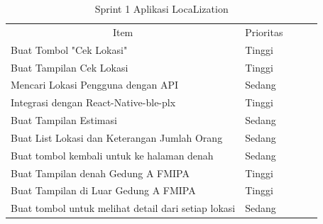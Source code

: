 \begin{enumerate}[1.]
	      \begin{table}[H]
		      \centering
		      \caption{Sprint 1 Aplikasi LocaLization}
		      \label{LocaLization-sprint-1}
		      \begin{tabular}{lllll}
			      \cline{1-2}
			      \multicolumn{1}{|c|}{\cellcolor[HTML]{FFFFFF}Item}                        & \multicolumn{1}{c|}{\cellcolor[HTML]{FFFFFF}Prioritas} &  &  & \\ \cline{1-2}
			      \multicolumn{1}{|l|}{Buat Tombol "Cek Lokasi"}                            & \multicolumn{1}{l|}{Tinggi}                            &  &  & \\ \cline{1-2}
			      \multicolumn{1}{|l|}{Buat Tampilan Cek Lokasi}                            & \multicolumn{1}{l|}{Tinggi}                            &  &  & \\ \cline{1-2}
			      \multicolumn{1}{|l|}{Mencari Lokasi Pengguna dengan API}                  & \multicolumn{1}{l|}{Sedang}                            &  &  & \\ \cline{1-2}
			      \multicolumn{1}{|l|}{Integrasi dengan React-Native-ble-plx}               & \multicolumn{1}{l|}{Tinggi}                            &  &  & \\ \cline{1-2}
			      \multicolumn{1}{|l|}{Buat Tampilan Estimasi}                              & \multicolumn{1}{l|}{Sedang}                            &  &  & \\ \cline{1-2}
			      \multicolumn{1}{|l|}{Buat List Lokasi dan Keterangan Jumlah Orang}        & \multicolumn{1}{l|}{Sedang}                            &  &  & \\ \cline{1-2}
			      \multicolumn{1}{|l|}{Buat tombol kembali untuk ke halaman denah}          & \multicolumn{1}{l|}{Sedang}                            &  &  & \\ \cline{1-2}
			      \multicolumn{1}{|l|}{Buat Tampilan denah Gedung A FMIPA}                  & \multicolumn{1}{l|}{Tinggi}                            &  &  & \\ \cline{1-2}
			      \multicolumn{1}{|l|}{Buat Tampilan di Luar Gedung A FMIPA}                & \multicolumn{1}{l|}{Tinggi}                            &  &  & \\ \cline{1-2}
			      \multicolumn{1}{|l|}{Buat tombol untuk melihat detail dari setiap lokasi} & \multicolumn{1}{l|}{Sedang}                            &  &  & \\ \cline{1-2}
		      \end{tabular}
	      \end{table}


\end{enumerate}
